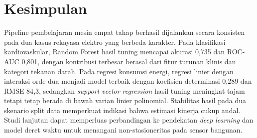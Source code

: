 \documentclass[conference]{IEEEtran}
\begin{document}
\section{Kesimpulan}
Pipeline pembelajaran mesin empat tahap berhasil dijalankan secara konsisten pada dua kasus rekayasa elektro yang berbeda karakter. Pada klasifikasi kardiovaskular, Random Forest hasil tuning mencapai akurasi 0{,}735 dan ROC-AUC 0{,}801, dengan kontribusi terbesar berasal dari fitur turunan klinis dan kategori tekanan darah. Pada regresi konsumsi energi, regresi linier dengan interaksi orde dua menjadi model terbaik dengan koefisien determinasi 0{,}289 dan RMSE 84{,}3, sedangkan \textit{support vector regression} hasil tuning meningkat tajam tetapi tetap berada di bawah varian linier polinomial. Stabilitas hasil pada dua skenario split data memperkuat indikasi bahwa estimasi kinerja cukup andal. Studi lanjutan dapat memperluas perbandingan ke pendekatan \textit{deep learning} dan model deret waktu untuk menangani non-stasioneritas pada sensor bangunan.
\end{document}

